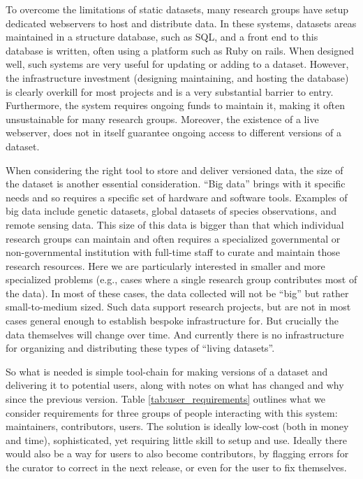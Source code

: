 \documentclass[a4paper,11pt]{article}
\begin{document}
To overcome the limitations of static datasets, many research groups have
setup dedicated webservers to host and distribute data. In these systems,
datasets areas maintained in a structure database, such as SQL, and a front
end to this database is written, often using a platform such as Ruby on rails.
When designed well, such systems are very useful for updating or adding to a
dataset. However, the infrastructure investment (designing maintaining, and
hosting the database) is clearly overkill for most projects and is a very
substantial barrier to entry. Furthermore, the system requires ongoing funds to maintain it, making it often unsustainable for many research groups. Moreover, the existence of a live webserver,
does not in itself guarantee ongoing access to different versions of a
dataset.

When considering the right tool to store and deliver versioned data, the size
of the dataset is another essential consideration. ``Big data'' brings with it
specific needs and so requires a specific set of hardware and software tools.
Examples of big data include genetic datasets, global datasets of species
observations, and remote sensing data. This size of this data is bigger than
that which individual research groups can maintain and often requires a
specialized governmental or non-governmental institution with full-time staff
to curate and maintain those research resources. Here we are particularly
interested in smaller and more specialized problems (e.g., cases where a single 
research group contributes most of the data). In most of these cases, the data
collected will not be ``big'' but rather small-to-medium sized. Such data
support research projects, but are not in most cases general enough to
establish bespoke infrastructure for. But crucially the data themselves will change
over time. And currently there is no infrastructure for organizing and
distributing these types of ``living datasets''.

So what is needed is simple tool-chain for
making versions of a dataset and delivering it to potential users, along
with notes on what has changed and why since the previous version.
Table \ref{tab:user_requirements} outlines what we consider requirements for
three groups of people interacting with this system: maintainers,
contributors, users. The solution is ideally low-cost (both in money and
time), sophisticated, yet requiring little skill to setup and use.  Ideally
there would also be a way for users to also become contributors, by flagging
errors for the curator to correct in the next release, or even for the user to
fix themselves.
\end{document}
